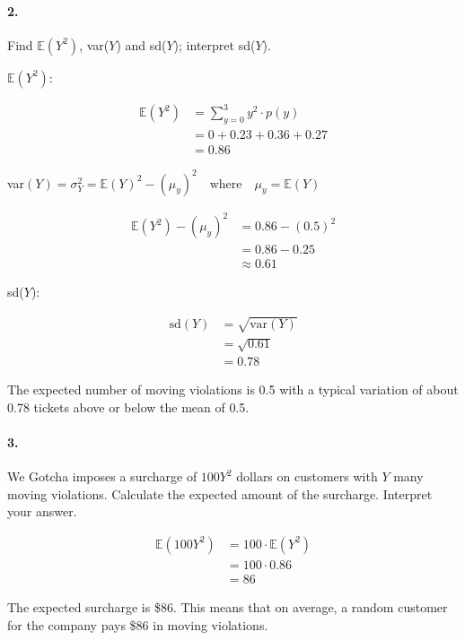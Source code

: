     \paragraph*{2.}
    Find $\mathbb{E}(Y^2)$, var($Y$) and sd($Y$); interpret sd($Y$).

    \begin{mdframed}
        $\mathbb{E}(Y^2)$:

        \begin{align*}
            \mathbb{E}(Y^2) & = \sum_{y=0}^{3} y^2 \cdot p(y)   \\
                            & = 0 + 0.23 + 0.36 + 0.27          \\
                            & = \boxed{0.86}
        \end{align*}

        var$(Y) = \sigma^2_Y = \mathbb{E}(Y)^2 -(\mu_y)^2   \quad   \text{where} \quad  \mu_y = \mathbb{E}(Y)$

        \begin{align*}
            \mathbb{E}(Y^2) -(\mu_y)^2  & = 0.86 - (0.5)^2  \\
                                        & = 0.86 - 0.25     \\
                                        & \approx \boxed{0.61}
        \end{align*}

        sd($Y$):
        
        \begin{align*}
            \text{sd}(Y)    & = \sqrt{\text{var}(Y)}    \\
                            & = \sqrt{0.61}             \\
                            & = \boxed{0.78}
        \end{align*}
    
        The expected number of moving violations is 0.5 with a typical variation of about 0.78 tickets above or below the mean of 0.5.
    \end{mdframed}

    \paragraph*{3.}
    We Gotcha imposes a surcharge of $100Y^2$ dollars on customers with $Y$ many moving violations. Calculate the expected amount of the surcharge. Interpret your answer.

    \begin{mdframed}
        \begin{align*}
            \mathbb{E}(100Y^2)  & = 100 \cdot \mathbb{E}(Y^2)   \\
                                & = 100 \cdot 0.86              \\
                                & = \boxed{86}
        \end{align*}

        The expected surcharge is \$86. This means that on average, a random customer for the company pays \$86 in moving violations.
    \end{mdframed}
    
